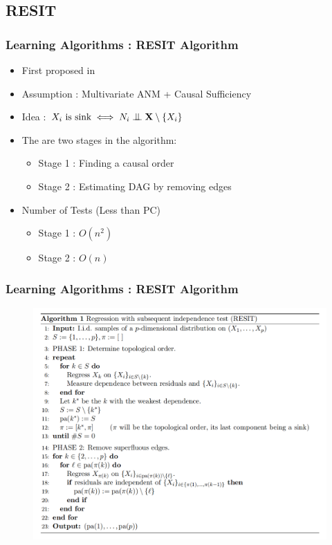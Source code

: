 \documentclass{beamer}
\newcommand{\bigCI}{\mathrel{\text{\scalebox{1.07}{$\perp\mkern-10mu\perp$}}}}
\begin{document}
\subsection{RESIT}
\begin{frame}
\frametitle{Learning Algorithms : RESIT Algorithm}
\begin{itemize}
	\item First proposed in \cite{continous}
	\item Assumption : Multivariate ANM + Causal Sufficiency 
	 \item Idea :  $X_i \textrm{ is sink} \iff N_i \bigCI \mathbf{X} \setminus \{X_i\}$ 
	\item The are two stages in the algorithm:
		\begin{itemize}
			\item Stage 1 : Finding a causal order 
			\item Stage 2 : Estimating DAG by removing edges
		\end{itemize}
	\item Number of Tests (Less than PC)
		\begin{itemize}
			\item Stage 1 : $O(n^2)$			
			\item Stage 2 : $O(n)$
		\end{itemize}
\end{itemize}
\end{frame}

\begin{frame}
\frametitle{Learning Algorithms : RESIT Algorithm}
\begin{figure}
	\includegraphics[scale=0.2]{alg.png}
\end{figure}
\end{frame}
\end{document}
